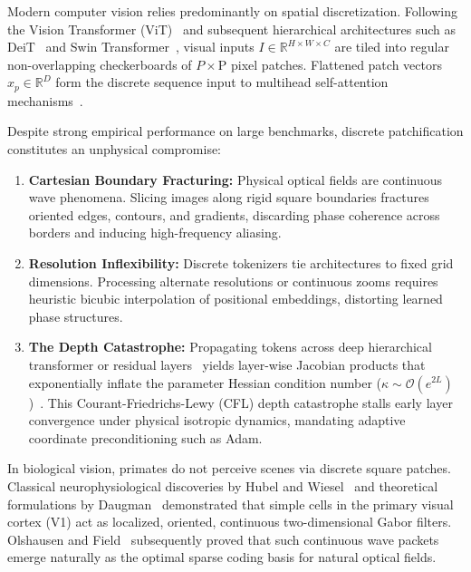\documentclass[10pt,twocolumn]{article}
\begin{document}
Modern computer vision relies predominantly on spatial discretization. Following the Vision Transformer (ViT)~\cite{dosovitskiy2020image} and subsequent hierarchical architectures such as DeiT~\cite{touvron2021training} and Swin Transformer~\cite{liu2021swin}, visual inputs $I \in \mathbb{R}^{H \times W \times C}$ are tiled into regular non-overlapping checkerboards of $P \times $P pixel patches. Flattened patch vectors $x_p \in \mathbb{R}^D$ form the discrete sequence input to multihead self-attention mechanisms~\cite{vaswani2017attention}.

Despite strong empirical performance on large benchmarks, discrete patchification constitutes an unphysical compromise:
\begin{enumerate}
    \item \textbf{Cartesian Boundary Fracturing:} Physical optical fields are continuous wave phenomena. Slicing images along rigid square boundaries fractures oriented edges, contours, and gradients, discarding phase coherence across borders and inducing high-frequency aliasing.
    \item \textbf{Resolution Inflexibility:} Discrete tokenizers tie architectures to fixed grid dimensions. Processing alternate resolutions or continuous zooms requires heuristic bicubic interpolation of positional embeddings, distorting learned phase structures.
    \item \textbf{The Depth Catastrophe:} Propagating tokens across deep hierarchical transformer or residual layers~\cite{he2016deep} yields layer-wise Jacobian products that exponentially inflate the parameter Hessian condition number ($\kappa \sim \mathcal{O}(e^{2L})$)~\cite{barmase2026variational}. This Courant-Friedrichs-Lewy (CFL) depth catastrophe stalls early layer convergence under physical isotropic dynamics, mandating adaptive coordinate preconditioning such as Adam.
\end{enumerate}

In biological vision, primates do not perceive scenes via discrete square patches. Classical neurophysiological discoveries by Hubel and Wiesel~\cite{hubel1959receptive} and theoretical formulations by Daugman~\cite{daugman1985uncertainty} demonstrated that simple cells in the primary visual cortex (V1) act as localized, oriented, continuous two-dimensional Gabor filters. Olshausen and Field~\cite{olshausen1996emergence} subsequently proved that such continuous wave packets emerge naturally as the optimal sparse coding basis for natural optical fields.
\end{document}
